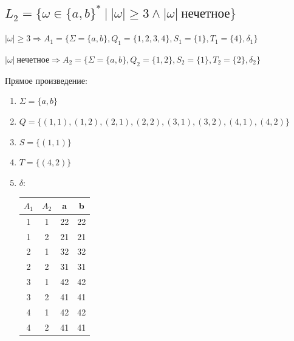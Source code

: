 \documentclass[a4paper,12pt]{article}
\begin{document}
\newpage

\subsection{$L_2 = \{\omega \in \{a, b\}^{*} \: | \: |\omega| \geq 3 \land |\omega| \: \text{нечетное}\}$}

    $|\omega| \geq 3 \Rightarrow A_1 = \{\Sigma = \{a, b\}, Q_1 = \{1, 2, 3, 4\}, S_1 =\{ 1\}, T_1 = \{4\}, \delta_1 \}$ 
    
    \begin{center}
    \end{center}
    
    $|\omega| \: \text{нечетное} \Rightarrow A_2 = \{\Sigma = \{a, b\}, Q_2 = \{1, 2\}, S_2 =\{ 1\}, T_2 = \{2\}, \delta_2\}$

    \begin{center}
    \end{center}
    
    \newpage
    
    Прямое произведение:
        
        \begin{enumerate}
            \item $\Sigma = \{a, b\}$
            \item $Q = \{(1, 1), (1, 2), (2, 1), (2, 2), (3, 1), (3, 2), (4, 1), (4, 2)\}$
            \item $S = \{(1, 1)\}$
            \item $T = \{(4,2)\}$
            \item $\delta:$
            \begin{tabular}{|c|c|c|c|}
                \hline
                $A_1$ & $A_2$ & a & b \\ \hline
                 1 & 1 & 22 & 22 \\ \hline
                 1 & 2 & 21 & 21 \\ \hline
                 2 & 1 & 32 & 32 \\ \hline
                 2 & 2 & 31 & 31 \\ \hline
                 3 & 1 & 42 & 42 \\ \hline
                 3 & 2 & 41 & 41 \\ \hline
                 4 & 1 & 42 & 42 \\ \hline
                 4 & 2 & 41 & 41 \\
                \hline
            \end{tabular} 
        \end{enumerate}
\end{document}

